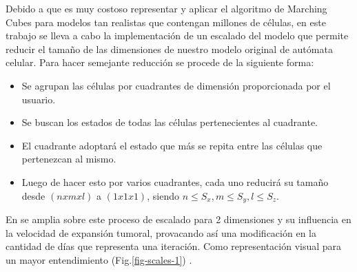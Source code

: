 Debido a que es muy costoso representar y aplicar el algoritmo de Marching Cubes para modelos tan realistas que contengan millones de c\'elulas, en este trabajo se lleva a cabo la implementaci\'on de un escalado del modelo que permite reducir el tama\~no de las dimensiones de nuestro modelo original de aut\'omata celular. Para hacer semejante reducci\'on se procede de la siguiente forma:
\begin{itemize}
    \item Se agrupan las c\'elulas por cuadrantes de dimensi\'on proporcionada por el usuario.
    \item Se buscan los estados de todas las c\'elulas pertenecientes al cuadrante.
    \item El cuadrante adoptar\'a el estado que m\'as se repita entre las c\'elulas que pertenezcan al mismo.
    \item Luego de hacer esto por varios cuadrantes, cada uno reducir\'a su tama\~no desde $(n x m x l)$ a $(1 x 1 x 1)$, siendo $n \leq S_{x} ,m \leq S_{y},l \leq S_{z}$. 
\end{itemize}

En \cite{viabarre2019} se amplia sobre este proceso de escalado para 2 dimensiones y su influencia en la velocidad de expansi\'on tumoral, provacando as\'i una modificaci\'on en la cantidad de d\'ias que representa una iteraci\'on. Como representación visual para un mayor entendimiento (Fig.\ref{fig-scales-1}) .


